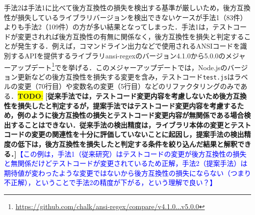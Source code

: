 \documentclass[submit]{ipsj}
\newcommand{\todo}[1]{\colorbox{yellow}{{\bf TODO}:}{\color{red} {\textbf{[#1]}}}}
\begin{document}
手法2は手法1に比べて後方互換性の損失を検出する基準が厳しいため，後方互換性が損失しているライブラリバージョンを検出できないケースが手法1（83件）よりも手法2（109件）の方が多い結果となってしまった．手法1は，テストコードが変更されれば後方互換性の有無に関係なく，後方互換性を損失と判定することが発生する．例えば，コマンドライン出力などで使用されるANSIコードを識別するAPIを提供するライブラリansi-regexのバージョン4.1.0から5.0.0のメジャーアップデート\footnote{\url{https://github.com/chalk/ansi-regex/compare/v4.1.0...v5.0.0}}でを挙げる．このメジャーアップデートでは，Node.jsのバージョン更新などの後方互換性を損失する変更を含み，テストコード\verb|test.js|はラベルの変更（70行目）や変数名の変更（5行目）などのリファクタリングのみである．\todo{従来手法では，テストコード変更内容を考慮しないため後方互換性を損失したと判定するが，提案手法ではテストコード変更内容を考慮するため，例のように後方互換性の損失とテストコード変更内容が無関係である場合検出することはできない．従来手法の検出精度は，ライブラリ本体の変更とテストコードの変更の関連性を十分に評価していないことに起因し，提案手法の検出精度の低下は，後方互換性を損失したと判定する条件を絞り込んだ結果と解釈できる．}\textcolor{blue}{【この例は，手法1（従来研究）はテストコードの変更が後方互換性の損失と無関係だけどテストコードが変更されているため正解，手法2（提案手法）は期待値が変わったような変更ではないから後方互換性の損失にならない（つまり不正解），ということで手法2の精度が下がる，という理解で良い？】}



\end{document}
